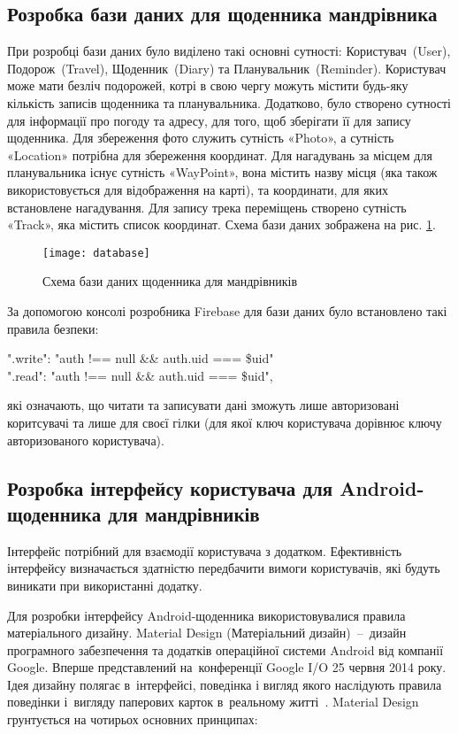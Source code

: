 \documentclass[../main.tex]{subfiles}
\begin{document}
\subsection{Розробка бази даних для щоденника мандрівника}
При розробці бази даних було виділено такі основні сутності: Користувач~(User), Подорож~(Travel), Щоденник~(Diary) та Планувальник~(Reminder). Користувач може мати безліч подорожей, котрі в свою чергу можуть містити будь-яку кількість записів щоденника та планувальника. Додатково, було створено сутності для інформації про погоду та адресу, для того, щоб зберігати її для запису щоденника. Для збереження фото служить сутність «Photo», а сутність «Location» потрібна для збереження координат. Для нагадувань за місцем для планувальника існує сутність «WayPoint», вона містить назву місця (яка також використовується для відображення на карті), та  координати, для яких встановлене нагадування. Для запису трека переміщень створено сутність «Track», яка містить список координат. Схема бази даних зображена на рис. \ref{diagram:database}.

\begin{figure}[H]
	\centering
	\texttt{[image: database]}
	\caption{Схема бази даних щоденника для мандрівників}
	\label{diagram:database}
\end{figure}

За допомогою консолі розробника Firebase для бази даних було встановлено такі правила безпеки:
\begin{center}
	".write": "auth !== null \&\& auth.uid === \$uid"\\
	".read": "auth !== null \&\& auth.uid === \$uid",
\end{center}
які означають, що читати та записувати дані зможуть лише авторизовані коритсувачі та лише для своєї гілки (для якої ключ користувача дорівнює ключу авторизованого користувача).

\subsection{Розробка інтерфейсу користувача для Android-щоденника для мандрівників}
Інтерфейс потрібний для взаємодії користувача з додатком. Ефективність інтерфейсу визначається здатністю передбачити вимоги користувачів, які будуть виникати при використанні додатку. 

Для розробки інтерфейсу Android-щоденника використовувалися правила матеріального дизайну. Material Design (Матеріальний дизайн)~--~дизайн програмного забезпечення та додатків операційної системи Android від компанії Google. Вперше представлений на~конференції Google I/O 25 червня 2014 року.  Ідея дизайну полягає в~інтерфейсі, поведінка і вигляд якого наслідують правила поведінки і~вигляду паперових карток в~реальному житті~\cite{materail_design}. Material Design грунтується на чотирьох основних принципах:
\end{document}
